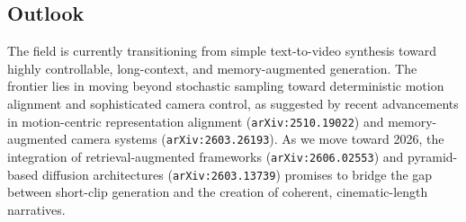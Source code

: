 \documentclass[11pt]{article}
\begin{document}
\subsection{Outlook}

The field is currently transitioning from simple text-to-video synthesis toward highly controllable, long-context, and memory-augmented generation. The frontier lies in moving beyond stochastic sampling toward deterministic motion alignment and sophisticated camera control, as suggested by recent advancements in motion-centric representation alignment (\texttt{arXiv:2510.19022}) and memory-augmented camera systems (\texttt{arXiv:2603.26193}). As we move toward 2026, the integration of retrieval-augmented frameworks (\texttt{arXiv:2606.02553}) and pyramid-based diffusion architectures (\texttt{arXiv:2603.13739}) promises to bridge the gap between short-clip generation and the creation of coherent, cinematic-length narratives.
\end{document}
